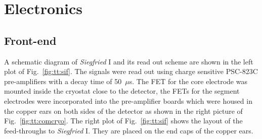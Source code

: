 \section{Electronics} 
\label{sec:tt:ele} 

\subsection{Front-end} 
\label{sec:tt:fend} 
A schematic diagram of \emph{Siegfried} I and its read out scheme are shown in the left plot of Fig.~\ref{fig:tt:sif}. The signals were read out using charge sensitive PSC-823C pre-amplifiers with a decay time of 50~$\mu$s. The FET for the core electrode was mounted inside the cryostat close to the detector, the FETs for the segment electrodes were incorporated into the pre-amplifier boards which were housed in the copper ears on both sides of the detector as shown in the right picture of Fig.~\ref{fig:tt:comcryo}. The right plot of Fig.~\ref{fig:tt:sif} shows the layout of the feed-throughs to \emph{Siegfried} I. They are placed on the end caps of the copper ears.

